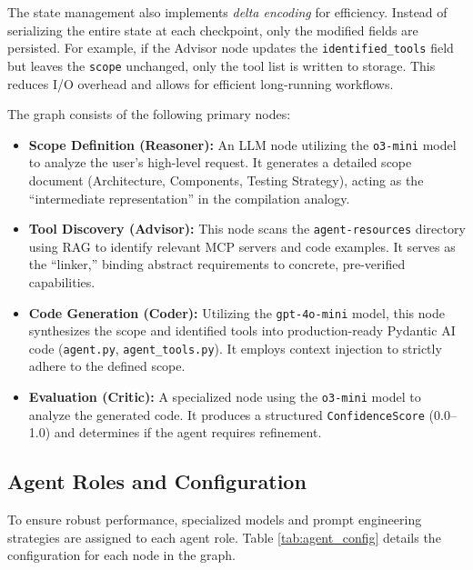\documentclass[lettersize,journal]{IEEEtran}
\begin{document}
The state management also implements \textit{delta encoding} for efficiency. Instead of serializing the entire state at each checkpoint, only the modified fields are persisted. For example, if the Advisor node updates the \texttt{identified\_tools} field but leaves the \texttt{scope} unchanged, only the tool list is written to storage. This reduces I/O overhead and allows for efficient long-running workflows.

The graph consists of the following primary nodes:

\begin{itemize}
    \item \textbf{Scope Definition (Reasoner):} An LLM node utilizing the \texttt{o3-mini} model to analyze the user's high-level request. It generates a detailed scope document (Architecture, Components, Testing Strategy), acting as the ``intermediate representation'' in the compilation analogy.
    \item \textbf{Tool Discovery (Advisor):} This node scans the \texttt{agent-resources} directory using RAG to identify relevant MCP servers and code examples. It serves as the ``linker,'' binding abstract requirements to concrete, pre-verified capabilities.
    \item \textbf{Code Generation (Coder):} Utilizing the \texttt{gpt-4o-mini} model, this node synthesizes the scope and identified tools into production-ready Pydantic AI code (\texttt{agent.py}, \texttt{agent\_tools.py}). It employs context injection to strictly adhere to the defined scope.
    \item \textbf{Evaluation (Critic):} A specialized node using the \texttt{o3-mini} model to analyze the generated code. It produces a structured \texttt{ConfidenceScore} (0.0--1.0) and determines if the agent requires refinement.
\end{itemize}

\subsection{Agent Roles and Configuration}
To ensure robust performance, specialized models and prompt engineering strategies are assigned to each agent role. Table \ref{tab:agent_config} details the configuration for each node in the graph.
\end{document}
